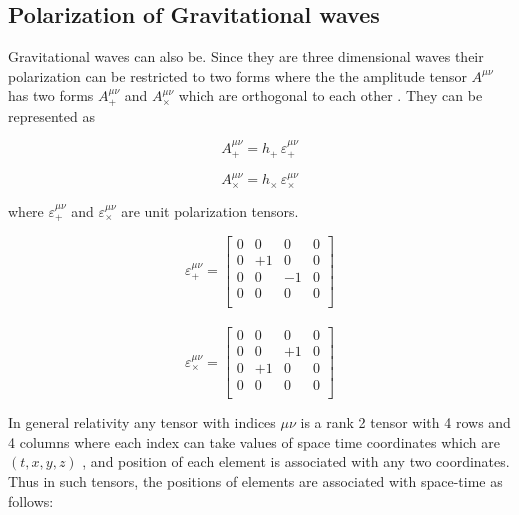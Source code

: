 \subsection{Polarization of Gravitational waves}


Gravitational waves can also be. Since they are three dimensional waves their polarization can be restricted to two forms where the the amplitude tensor $A^{\mu\nu}$ has two forms $A^{\mu\nu}_{+}$ and $A^{\mu\nu}_{\times}$ which are orthogonal to each other \cite{Dirkes_2018}. They can be represented as 

\begin{equation}
    A^{\mu\nu}_{+} = h_{+}\, \varepsilon^{\mu\nu}_{+}
\end{equation}

\begin{equation}
    A^{\mu\nu}_{\times} = h_{\times} \,\varepsilon^{\mu\nu}_{\times}
\end{equation}

\noindent where $\varepsilon^{\mu\nu}_{+}$ and $\varepsilon^{\mu\nu}_{\times}$ are unit polarization tensors.

\begin{equation}
\varepsilon^{\mu\nu}_{+} =
\begin{bmatrix}
0 & 0 & 0 & 0 \\
0 & +1 & 0 & 0 \\
0 & 0 & -1 & 0 \\
0 & 0 & 0 & 0 \\
\end{bmatrix}
\end{equation}
\\
\begin{equation}
\varepsilon^{\mu\nu}_{\times} =
\begin{bmatrix}
0 & 0 & 0 & 0 \\
0 & 0 & +1 & 0 \\
0 & +1 & 0 & 0 \\
0 & 0 & 0 & 0 \\
\end{bmatrix}
\end{equation}

\noindent In general relativity any tensor with indices $\mu\nu$ is a rank 2 tensor with 4 rows and 4 columns where each index can take values of space time coordinates which are $(t,x,y,z)$ , and position of each element is associated with any two coordinates. Thus in such tensors, the positions of elements are associated with space-time as follows:

